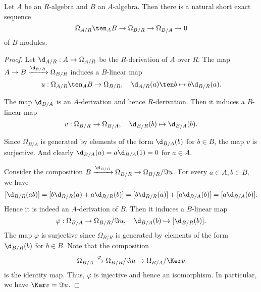     \begin{theorem}\label{thm: the first exact sequence of differentials}
        Let \(A\) be an \(R\)-algebra and \(B\) an \(A\)-algebra. 
        Then there is a natural short exact sequence
        \[ \Omega_{A/R} \ten_A B \to \Omega_{B/R} \to \Omega_{B/A} \to 0 \]
        of \(B\)-modules.
    \end{theorem}
    \begin{proof}
        Let \(\d_{A/R}: A \to \Omega_{A/R}\) be the \(R\)-derivation of \(A\) over \(R\).
        The map \(A \to B \xrightarrow{\d_{B/R}} \Omega_{B/R}\) induces a \(B\)-linear map 
        \[ u: \Omega_{A/R} \ten_A B \to \Omega_{B/R}, \quad \d_{A/R}(a) \ten b \mapsto b\d_{B/R}(a). \]
        
        The map \(\d_{B/A}\) is an \(A\)-derivation and hence \(R\)-derivation.
        Then it induces a \(B\)-linear map 
        \[ v: \Omega_{B/R} \to \Omega_{B/A}, \quad \d_{B/R}(b) \mapsto \d_{B/A}(b). \]

        Since \(\Omega_{B/A}\) is generated by elements of the form \(\d_{B/A}(b)\) for \(b \in B\),
        the map \(v\) is surjective.
        And clearly \(\d_{B/A}(a) = a\d_{B/A}(1) = 0\) for \(a \in A\). 

        Consider the composition \( B \xrightarrow{\d_{B/R}} \Omega_{B/R} \to \Omega_{B/R}/\Im u\).
        For every \(a \in A, b\in B\), we have 
        \[ [\d_{B/R}(ab)] = [b\d_{B/R}(a) + a\d_{B/R}(b)] = [b\d_{B/R}(a)] + [a\d_{B/A}(b)] = [a\d_{B/A}(b)]. \]
        Hence it is indeed an \(A\)-derivation of \(B\).
        Then it induces a \(B\)-linear map 
        \[ \varphi: \Omega_{B/A} \to \Omega_{B/R}/\Im u, \quad \d_{B/A}(b) \mapsto [\d_{B/R}(b)]. \]
        The map \(\varphi\) is surjective since \(\Omega_{B/R}\) is generated by elements of the form \(\d_{B/R}(b)\) for \(b \in B\).
        Note that the composition 
        \[ \Omega_{B/A} \xrightarrow{\varphi} \Omega_{B/R}/\Im u \to \Omega_{B/A}/\Ker v \]
        is the identity map.
        Thus, \(\varphi\) is injective and hence an isomorphism.
        In particular, we have \(\Ker v = \Im u\).
    \end{proof}

